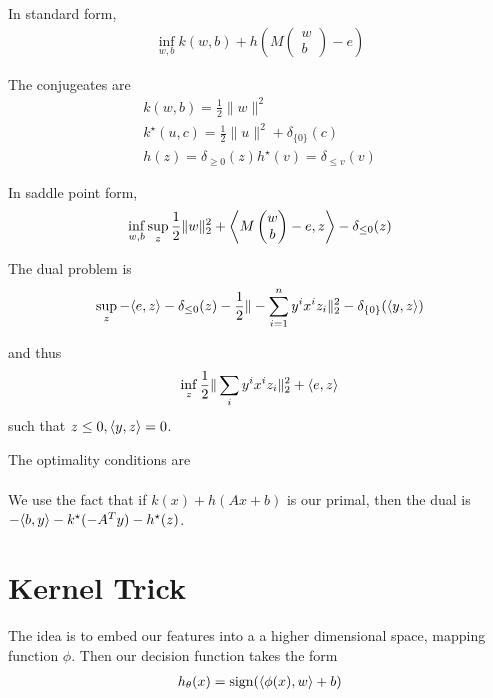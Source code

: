 \begin{defn}
  \label{defn:support_vector_machines:2}
  In standard form,
  \begin{align}
    \label{eq:97}
    \inf_{w, b} k(w, b) + h(M
    \begin{pmatrix}
      w \\
      b
    \end{pmatrix}
    - e)
  \end{align}

  The conjugeates are
  \begin{align}
    \label{eq:98}
    k(w, b) = \frac{1}{2} \| w \|^{2} \\
    k^{\star}(u, c) = \frac{1}{2} \| u \|^{2} + \delta_{\{ 0 \}}(c) \\
    h(z) = \delta_{\geq 0}(z)
    h^{\star}(v) = \delta_{\leq v}(v)
  \end{align}

  In saddle point form,
  \begin{align}
    \label{eq:99}
    \inf_{w, b} \sup_{z} \frac{1}{2} \| w \|_{2}^{2} + \IP{M
      \begin{pmatrix}
        w \\
        b
      \end{pmatrix} - e, z} - \delta_{\leq 0}(z)
  \end{align}

  The dual problem is
  \begin{align}
    \label{eq:100}
    \sup_{z} - \IP{e, z} - \delta_{\leq 0}(z) - \frac{1}{2} \| -
    \sum_{i=1}^{n} y^{i} x^{i} z_{i} \|_{2}^{2} - \delta_{\{ 0
      \}}(\IP{y, z})
  \end{align}

  and thus
  \begin{align}
    \label{eq:101}
    \inf_{z} \frac{1}{2} \| \sum_{i} y^{i} x^{i} z_{i} \|_{2}^{2} +
    \IP{e, z}
  \end{align} such that $z \leq 0, \IP{y, z} = 0$.

  The optimality conditions are
  \begin{align}
    \label{eq:102}
  \end{align}

  We use the fact that if $k(x) + h(Ax + b)$ is our primal,
  then the dual is $-\IP{b, y} - k^{\star}(-A^{T}y) - h^{\star}(z)$.
\end{defn}


\section{Kernel Trick}
\label{sec:kernel-trick}

The idea is to embed our features into a a higher dimensional space,
mapping function $\phi$.  Then our decision function takes the form
\begin{align}
  \label{eq:103}
  h_{\theta}(x) = \sign(\IP{\phi(x), w} + b)
\end{align}





